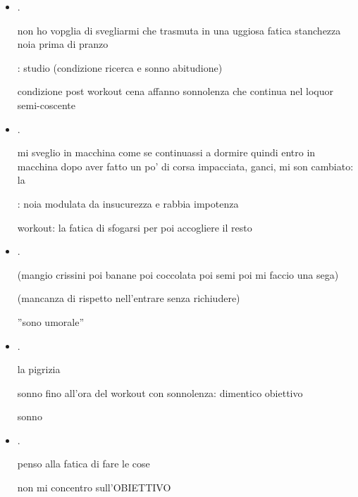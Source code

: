 \begin{itemize}
\item {}.

non ho vopglia di svegliarmi che trasmuta in una uggiosa fatica stanchezza noia prima di pranzo

: studio (condizione ricerca e sonno abitudione)

condizione post workout cena affanno sonnolenza che continua nel loquor semi-coscente

\item {}.

mi sveglio in macchina come se continuassi a dormire quindi entro in macchina dopo aver fatto un po' di corsa impacciata, ganci, mi son cambiato: la 

: noia modulata da insucurezza e rabbia impotenza

workout: la fatica di sfogarsi per poi accogliere il resto

\item {}.

(mangio crissini poi banane poi coccolata poi semi poi mi faccio una sega)

(mancanza di rispetto nell'entrare senza richiudere)

''sono umorale''


\item {}.


la pigrizia

sonno fino all'ora del workout con sonnolenza: dimentico obiettivo 




sonno

\item {}.

penso alla fatica di fare le cose

non mi concentro sull'OBIETTIVO


\end{itemize}
